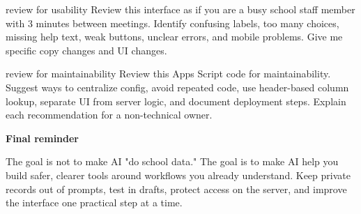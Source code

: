 \documentclass[10pt]{article}
\begin{document}
\begin{promptbox}{review for usability}
Review this interface as if you are a busy school staff member with 3 minutes between meetings. Identify confusing labels, too many choices, missing help text, weak buttons, unclear errors, and mobile problems. Give me specific copy changes and UI changes.
\end{promptbox}

\begin{promptbox}{review for maintainability}
Review this Apps Script code for maintainability. Suggest ways to centralize config, avoid repeated code, use header-based column lookup, separate UI from server logic, and document deployment steps. Explain each recommendation for a non-technical owner.
\end{promptbox}

\begin{darkband}
{\color{GCWhite}\large\bfseries Final reminder}\par
{\color{GCPanelDark}\small The goal is not to make AI "do school data." The goal is to make AI help you build safer, clearer tools around workflows you already understand. Keep private records out of prompts, test in drafts, protect access on the server, and improve the interface one practical step at a time.}
\end{darkband}
\end{document}
